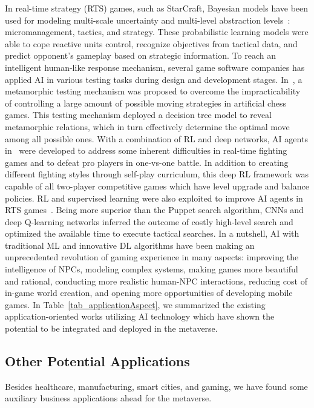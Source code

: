 \documentclass[journal]{IEEEtran}
\begin{document}
In real-time strategy (RTS) games, such as StarCraft, Bayesian models have been used for modeling multi-scale uncertainty and multi-level abstraction levels~\cite{synnaeve2016multiscale}: micromanagement, tactics, and strategy. These probabilistic learning models were able to cope reactive units control, recognize objectives from tactical data, and predict opponent’s gameplay based on strategic information.
To reach an intelligent human-like response mechanism, several game software companies has applied AI in various testing tasks during design and development stages. In~\cite{liaqat2020metamorphic}, a metamorphic testing mechanism was proposed to overcome the impracticability of controlling a large amount of possible moving strategies in artificial chess games. This testing mechanism deployed a decision tree model to reveal metamorphic relations, which in turn effectively determine the optimal move among all possible ones.
With a combination of RL and deep networks, AI agents in~\cite{oh2021creating} were developed to address some inherent difficulties in real-time fighting games and to defeat pro players in one-vs-one battle. In addition to creating different fighting styles through self-play curriculum, this deep RL framework was capable of all two-player competitive games which have level upgrade and balance policies.
RL and supervised learning were also exploited to improve AI agents in RTS games~\cite{barriga2019improving}. Being more superior than the Puppet search algorithm, CNNs and deep Q-learning networks inferred the outcome of costly high-level search and optimized the available time to execute tactical searches. 
In a nutshell, AI with traditional ML and innovative DL algorithms have been making an unprecedented revolution of gaming experience in many aspects: improving the intelligence of NPCs, modeling complex systems, making games more beautiful and rational, conducting more realistic human-NPC interactions, reducing cost of in-game world creation, and opening more opportunities of developing mobile games.
In Table~\ref{tab_applicationAspect}, we summarized the existing application-oriented works utilizing AI technology which have shown the potential to be integrated and deployed in the metaverse.

\subsection{Other Potential Applications}

Besides healthcare, manufacturing, smart cities, and gaming, we have found some auxiliary business applications ahead for the metaverse.
\end{document}
